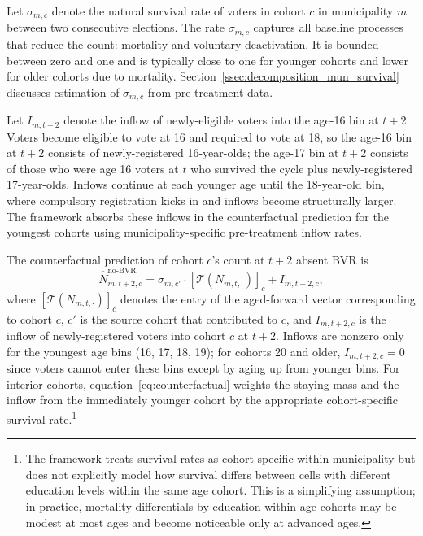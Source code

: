 Let $\sigma_{m,c}$ denote the natural survival rate of voters in cohort $c$ in municipality $m$ between two consecutive elections. The rate $\sigma_{m,c}$ captures all baseline processes that reduce the count: mortality and voluntary deactivation. It is bounded between zero and one and is typically close to one for younger cohorts and lower for older cohorts due to mortality. Section~\ref{ssec:decomposition_mun_survival} discusses estimation of $\sigma_{m,c}$ from pre-treatment data.

Let $I_{m,t+2}$ denote the inflow of newly-eligible voters into the age-16 bin at $t+2$. Voters become eligible to vote at 16 and required to vote at 18, so the age-16 bin at $t+2$ consists of newly-registered 16-year-olds; the age-17 bin at $t+2$ consists of those who were age 16 voters at $t$ who survived the cycle plus newly-registered 17-year-olds. Inflows continue at each younger age until the 18-year-old bin, where compulsory registration kicks in and inflows become structurally larger. The framework absorbs these inflows in the counterfactual prediction for the youngest cohorts using municipality-specific pre-treatment inflow rates.

The counterfactual prediction of cohort $c$'s count at $t+2$ absent BVR is
\begin{equation}
\widehat{N}_{m,t+2,c}^{\text{no-BVR}} = \sigma_{m,c'} \cdot \left[\mathcal{T}(N_{m,t,\cdot})\right]_c + I_{m,t+2,c},
\label{eq:counterfactual}
\end{equation}
where $\left[\mathcal{T}(N_{m,t,\cdot})\right]_c$ denotes the entry of the aged-forward vector corresponding to cohort $c$, $c'$ is the source cohort that contributed to $c$, and $I_{m,t+2,c}$ is the inflow of newly-registered voters into cohort $c$ at $t+2$. Inflows are nonzero only for the youngest age bins (16, 17, 18, 19); for cohorts 20 and older, $I_{m,t+2,c} = 0$ since voters cannot enter these bins except by aging up from younger bins. For interior cohorts, equation~\eqref{eq:counterfactual} weights the staying mass and the inflow from the immediately younger cohort by the appropriate cohort-specific survival rate.\footnote{The framework treats survival rates as cohort-specific within municipality but does not explicitly model how survival differs between cells with different education levels within the same age cohort. This is a simplifying assumption; in practice, mortality differentials by education within age cohorts may be modest at most ages and become noticeable only at advanced ages.}


